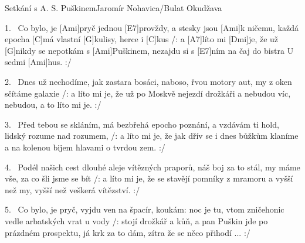 \begin{song}{Setkání s A. S. Puškinem}{Jaromír Nohavica/Bulat Okudžava}

\begin{xverse}{1.~}
Co bylo, je [\large Ami]pryč jednou [\large E7]provždy, a stesky jsou [\large Ami]k ničemu,
každá epocha [\large C]má vlastní [\large G]kulisy, herce i [\large C]kus
/: a [\large A7]líto mi [\large Dmi]je, že už [\large G]nikdy se nepotkám s [\large Ami]Puškinem,
nezajdu si s [\large E7]ním na čaj do bistra U sedmi [\large Ami]hus. :/
\end{xverse}

\begin{xverse}{2.~}
Dnes už nechodíme, jak zastara bosáci, naboso,
řvou motory aut, my z oken sčítáme galaxie
/: a líto mi je, že už po Moskvě nejezdí drožkáři
a nebudou víc, nebudou, a to líto mi je. :/
\end{xverse}

\begin{xverse}{3.~}
Před tebou se skláním, má bezbřehá epocho poznání,
a vzdávám ti hold, lidský rozume nad rozumem,
/: a líto mi je, že jak dřív se i dnes bůžkům klaníme
a na kolenou bijem hlavami o tvrdou zem. :/
\end{xverse}

\begin{xverse}{4.~}
Podél našich cest dlouhé aleje vítězných praporů,
náš boj za to stál, my máme vše, za co šli jsme se bít
/: a líto mi je, že se stavějí pomníky z mramoru
a vyšší než my, vyšší než veškerá vítězství. :/
\end{xverse}

\begin{xverse}{5.~}
Co bylo, je pryč, vyjdu ven na špacír, koukám: noc je tu,
vtom zničehonic vedle arbatských vrat u vody
/: stojí drožkář a kůň, a pan Puškin jde po prázdném prospektu,
já krk za to dám, zítra že se něco přihodí ... :/
\end{xverse}

\end{song}


